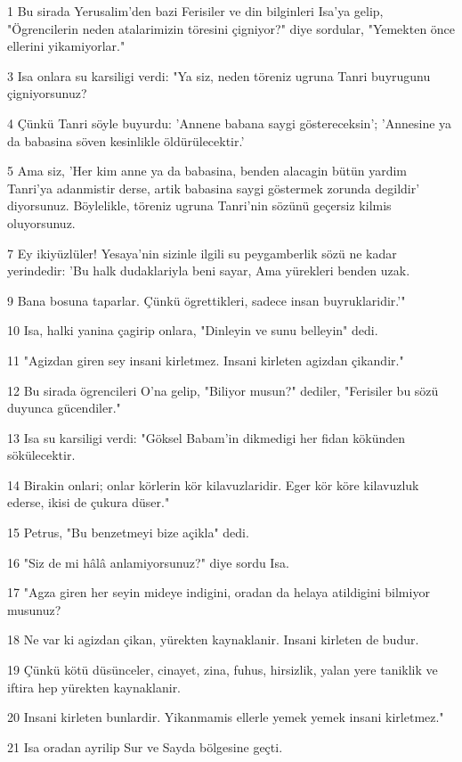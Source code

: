 \par 1 Bu sirada Yerusalim'den bazi Ferisiler ve din bilginleri Isa'ya gelip, "Ögrencilerin neden atalarimizin töresini çigniyor?" diye sordular, "Yemekten önce ellerini yikamiyorlar."
\par 3 Isa onlara su karsiligi verdi: "Ya siz, neden töreniz ugruna Tanri buyrugunu çigniyorsunuz?
\par 4 Çünkü Tanri söyle buyurdu: 'Annene babana saygi göstereceksin'; 'Annesine ya da babasina söven kesinlikle öldürülecektir.'
\par 5 Ama siz, 'Her kim anne ya da babasina, benden alacagin bütün yardim Tanri'ya adanmistir derse, artik babasina saygi göstermek zorunda degildir' diyorsunuz. Böylelikle, töreniz ugruna Tanri'nin sözünü geçersiz kilmis oluyorsunuz.
\par 7 Ey ikiyüzlüler! Yesaya'nin sizinle ilgili su peygamberlik sözü ne kadar yerindedir: 'Bu halk dudaklariyla beni sayar, Ama yürekleri benden uzak.
\par 9 Bana bosuna taparlar. Çünkü ögrettikleri, sadece insan buyruklaridir.'"
\par 10 Isa, halki yanina çagirip onlara, "Dinleyin ve sunu belleyin" dedi.
\par 11 "Agizdan giren sey insani kirletmez. Insani kirleten agizdan çikandir."
\par 12 Bu sirada ögrencileri O'na gelip, "Biliyor musun?" dediler, "Ferisiler bu sözü duyunca gücendiler."
\par 13 Isa su karsiligi verdi: "Göksel Babam'in dikmedigi her fidan kökünden sökülecektir.
\par 14 Birakin onlari; onlar körlerin kör kilavuzlaridir. Eger kör köre kilavuzluk ederse, ikisi de çukura düser."
\par 15 Petrus, "Bu benzetmeyi bize açikla" dedi.
\par 16 "Siz de mi hâlâ anlamiyorsunuz?" diye sordu Isa.
\par 17 "Agza giren her seyin mideye indigini, oradan da helaya atildigini bilmiyor musunuz?
\par 18 Ne var ki agizdan çikan, yürekten kaynaklanir. Insani kirleten de budur.
\par 19 Çünkü kötü düsünceler, cinayet, zina, fuhus, hirsizlik, yalan yere taniklik ve iftira hep yürekten kaynaklanir.
\par 20 Insani kirleten bunlardir. Yikanmamis ellerle yemek yemek insani kirletmez."
\par 21 Isa oradan ayrilip Sur ve Sayda bölgesine geçti.

